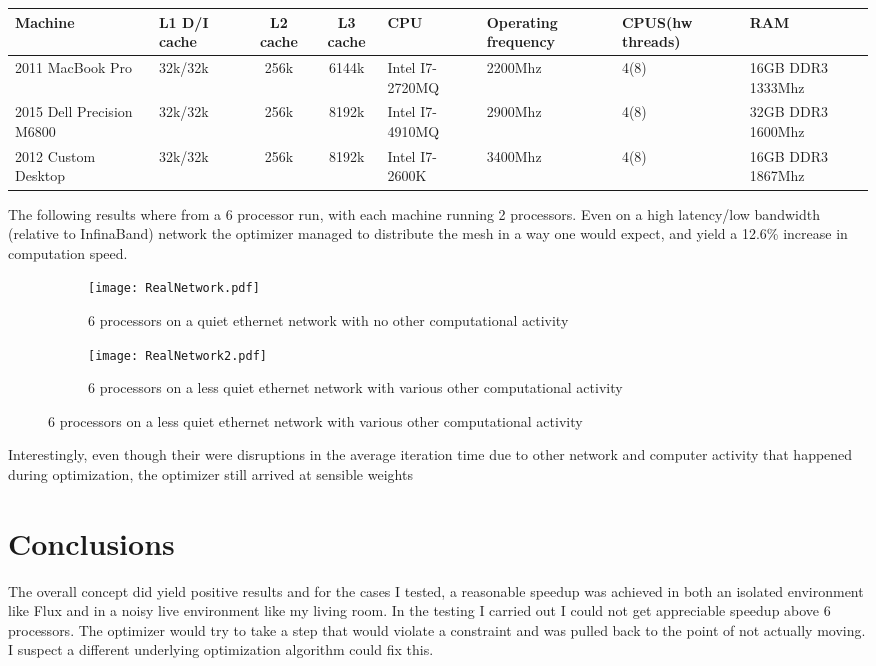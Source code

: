 \documentclass[12pt,parskip=full]{article}
\numberwithin{subsection}{section}
\begin{document}
		\begin{centering}
		\begin{tabular}{| m{1.8cm} | m{1.5cm} | c | c | m{1.5cm} | m{2cm} | m{1.8cm} | m{2cm} | }
			\hline
			Machine &	              L1 D/I cache & L2 cache & L3 cache & CPU &	    Operating frequency & CPUS(hw threads) & RAM \\ \hline\hline
			2011 MacBook Pro 	    & 32k/32k      & 256k     & 6144k    & Intel I7-2720MQ & 2200Mhz & 4(8) & 16GB DDR3 1333Mhz \\ \hline
			2015 Dell Precision M6800   & 32k/32k	   & 256k     & 8192k    & Intel I7-4910MQ & 2900Mhz & 4(8) & 32GB DDR3 1600Mhz \\ \hline
			2012 Custom Desktop	    & 32k/32k	   & 256k     & 8192k	 & Intel I7-2600K  & 3400Mhz & 4(8) & 16GB DDR3 1867Mhz \\ \hline
		\end{tabular}
		\end{centering}

		The following results where from a 6 processor run, with each machine running 2 processors. Even on a high latency/low bandwidth (relative to 
		InfinaBand) network the optimizer managed to distribute the mesh in a way one would expect, and yield a 12.6\% increase in computation speed.
		\begin{figure}[H]
			\centering
			\begin{subfigure}[H]{0.9\textwidth}
				\texttt{[image: RealNetwork.pdf]}
				\caption{6 processors on a quiet ethernet network with no other computational activity}
			\end{subfigure}
			\begin{subfigure}[H]{0.9\textwidth}
				\texttt{[image: RealNetwork2.pdf]}
				\caption{6 processors on a less quiet ethernet network with various other computational activity}
			\end{subfigure}
		\end{figure}
		Interestingly, even though their were disruptions in the average iteration time due to other network and computer activity that happened during
		optimization, the optimizer still arrived at sensible weights 

	\section{Conclusions}

		The overall concept did yield positive results and for the cases I tested, a reasonable speedup was achieved in both an isolated environment like Flux
		and in a noisy live environment like my living room. In the testing I carried out I could not get appreciable speedup above 6 processors. The optimizer
		would try to take a step that would violate a constraint and was pulled back to the point of not actually moving. I suspect a different underlying 
		optimization algorithm could fix this.
		
\end{document}

